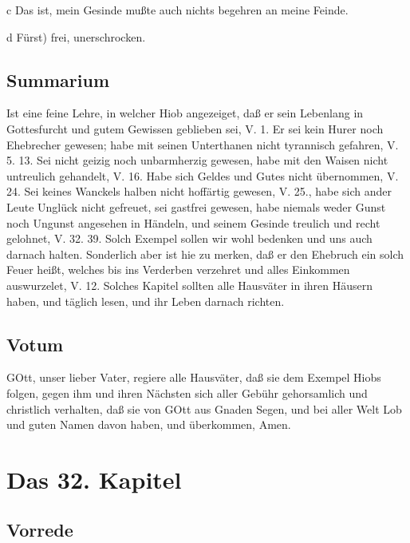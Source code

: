 c Das ist, mein Gesinde mußte auch nichts begehren an meine Feinde.

d Fürst) frei, unerschrocken.

\section{Summarium}

Ist eine feine Lehre, in welcher Hiob angezeiget, daß er sein Lebenlang in Gottesfurcht und gutem Gewissen geblieben sei, V. 1. Er sei kein Hurer noch Ehebrecher gewesen; habe mit seinen Unterthanen nicht tyrannisch gefahren, V. 5. 13. Sei nicht geizig noch unbarmherzig gewesen, habe mit den Waisen nicht untreulich gehandelt, V. 16. Habe sich Geldes und Gutes nicht übernommen, V. 24. Sei keines Wanckels halben nicht hoffärtig gewesen, V. 25., habe sich ander Leute Unglück nicht gefreuet, sei gastfrei gewesen, habe niemals weder Gunst noch Ungunst angesehen in Händeln, und seinem Gesinde treulich und recht gelohnet, V. 32. 39. Solch Exempel sollen wir wohl bedenken und uns auch darnach halten. Sonderlich aber ist hie zu merken, daß er den Ehebruch ein solch Feuer heißt, welches bis ins Verderben verzehret und alles Einkommen auswurzelet, V. 12. Solches Kapitel sollten alle Hausväter in ihren Häusern haben, und täglich lesen, und ihr Leben darnach richten.

\section{Votum}

GOtt, unser lieber Vater, regiere alle Hausväter, daß sie dem Exempel Hiobs folgen, gegen ihm und ihren Nächsten sich aller Gebühr gehorsamlich und christlich verhalten, daß sie von GOtt aus Gnaden Segen, und bei aller Welt Lob und guten Namen davon haben, und überkommen, Amen.

\chapter{Das 32. Kapitel}

\section{Vorrede}

